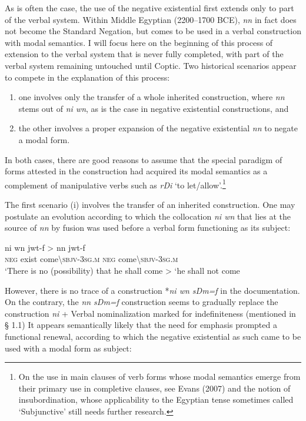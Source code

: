 \documentclass[output=paper]{langsci/langscibook}
\begin{document}
As is often the case, the use of the negative existential first extends only to part of the verbal system. Within Middle Egyptian (2200–1700 BCE), \textit{nn} in fact does not become the Standard Negation, but comes to be used in a verbal construction with modal semantics. I will focus here on the beginning of this process of extension to the verbal system that is never fully completed, with part of the verbal system remaining untouched until Coptic. Two historical scenarios appear to compete in the explanation of this process: 
\begin{enumerate}
    \item one involves only the transfer of a whole inherited construction, where \textit{nn} stems out of \textit{ni wn}, as is the case in negative existential constructions, and
    \item the other involves a proper expansion of the negative existential \textit{nn} to negate a modal form.
\end{enumerate}
 
In both cases, there are good reasons to assume that the special paradigm of forms attested in the construction had acquired its modal semantics as a complement of manipulative verbs such as \textit{rDi} ‘to let/allow’.\footnote{On the use in main clauses of verb forms whose modal semantics emerge from their primary use in completive clauses, see Evans (2007) and the notion of insubordination, whose applicability to the Egyptian tense sometimes called ‘Subjunctive’ still needs further research. }  

The first scenario (i) involves the transfer of an inherited construction. One may postulate an evolution according to which the collocation \textit{ni wn} that lies at the source of \textit{nn} by fusion was used before a verbal form functioning as its subject:  

\ea \label{ex:AE35}
    \gll *ni wn jwt-f > nn jwt-f \\
    \textsc{neg} exist come\textbackslash\textsc{sbjv-3sg.m} { } \textsc{neg} come\textbackslash\textsc{sbjv-3sg.m}\\ 
    \glt ‘There is no (possibility) that he shall come > ‘he shall not come 
\z 

However, there is no trace of a construction *\textit{ni wn sDm=f} in the documentation. On the contrary, the \textit{nn sDm=f} construction seems to gradually replace the construction \textit{ni} + Verbal nominalization marked for indefiniteness (mentioned in § 1.1) It appears semantically likely that the need for emphasis prompted a functional renewal, according to which the negative existential as such came to be used with a modal form as subject: 
\end{document}
